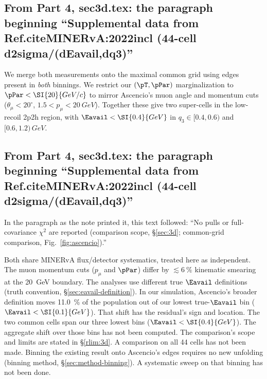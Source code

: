 \subsection{From Part 4, sec3d.tex: the paragraph beginning ``Supplemental data from Ref.citeMINERvA:2022incl (44-cell d2sigma/(dEavail,dq3)''}
We merge both measurements onto the maximal common grid using edges present in \emph{both} binnings. We restrict our $(\pT,\pPar)$ marginalization to $\pPar<\SI{20}{GeV/c}$ to mirror Ascencio's muon angle and momentum cuts ($\theta_\mu<20^{\circ}$, $1.5<p_\mu<\SI{20}{GeV}$). Together these give two super-cells in the low-recoil 2p2h region, with $\Eavail<\SI{0.4}{GeV}$ in $q_{3}\in[0.4,0.6)$ and $[0.6,1.2)\,\si{GeV}$.

\subsection{From Part 4, sec3d.tex: the paragraph beginning ``Supplemental data from Ref.citeMINERvA:2022incl (44-cell d2sigma/(dEavail,dq3)''}
In the paragraph as the note printed it, this text followed: ``No pulls or full-covariance $\chi^{2}$ are reported (comparison scope, \S\ref{sec:3d}; common-grid comparison, Fig.~\ref{fig:ascencio}).''\par
Both share MINERvA flux/detector systematics, treated here as independent. The muon momentum cuts ($p_\mu$ and $\pPar$) differ by $\lesssim\SI{6}{\percent}$ kinematic smearing at the \SI{20}{GeV} boundary. The analyses use different true $\Eavail$ definitions (truth convention, \S\ref{sec:eavail-definition}). In our simulation, Ascencio's broader definition moves \SI{11.0}{\percent} of the population out of our lowest true-$\Eavail$ bin ($\Eavail<\SI{0.1}{GeV}$). That shift has the residual's sign and location. The two common cells span our three lowest bins ($\Eavail<\SI{0.4}{GeV}$). The aggregate shift over those bins has not been computed. The comparison's scope and limits are stated in \S\ref{rlim:3d}. A comparison on all 44 cells has not been made. Binning the existing result onto Ascencio's edges requires no new unfolding (binning method, \S\ref{sec:method-binning}). A systematic sweep on that binning has not been done.

